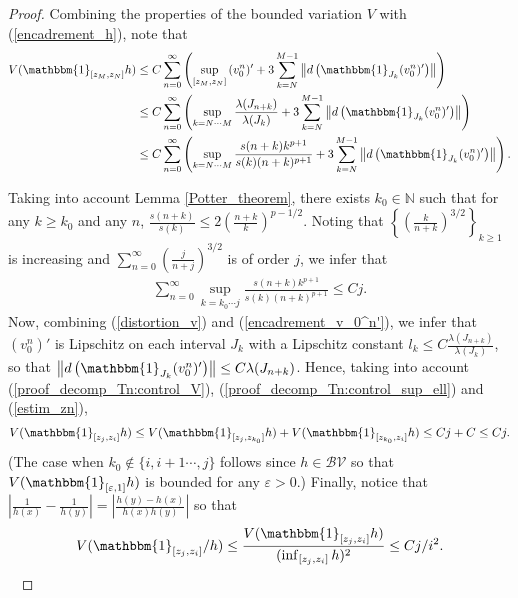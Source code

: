 \documentclass{ws-sd}
\newcommand{\indic}{\mathbbm{1}}
\newcommand{\norm}[1]{\left\Vert #1\right\Vert}
\newcommand{\abs}[1]{\left\lvert #1 \right\rvert}
\newcommand\bigp[1]{\left(#1\right)}
\begin{document}
\begin{proof}
Combining the properties of the bounded variation $V$ with (\ref{encadrement_h}), note that
\begin{align}
        \label{proof_decomp_Tn:control_V}
    V(\indic_{[z_M,z_N]}h)
    &\le
    C\sum_{n = 0}^\infty \bigp{\sup_{[z_M,z_N]}{(v_0^n)'} + 3 \sum_{k = N}^{M-1} \norm{d\bigp{\indic_{J_k}(v_0^n)'}}}
    \nonumber \\
    &\le
    C\sum_{n = 0}^\infty \bigp{\sup_{k = N \cdots M} \frac{\lambda(J_{n+k})}{\lambda(J_{k})} + 3 \sum_{k = N}^{M-1} \norm{d\bigp{\indic_{J_k}(v_0^n)'}}}
    \nonumber \\
    &\le
    C\sum_{n = 0}^\infty \bigp{\sup_{k = N \cdots M} \frac{s(n+k) k^{p+1}}{s(k) (n+k)^{p+1}} + 3 \sum_{k = N}^{M -1} \norm{d\bigp{\indic_{J_k}(v_0^n)'}}}.
\end{align}

Taking into account Lemma \ref{Potter_theorem}, there exists $k_0 \in \mathbb N$ such that for any $k \ge k_0$ and any $n$, $\frac{s(n+k)}{s(k)}\le 2\bigp{\frac{n+k}{k}}^{p-1/2}$. Noting that $\left\{\bigp{\frac{k}{n+k}}^{3/2}\right\}_{k \ge 1}$ is increasing and $\sum_{n = 0}^\infty \bigp{\frac{j}{n+j}}^{3/2}$ is of order $j$, we infer that
\begin{align}
        \label{proof_decomp_Tn:control_sup_ell}
    \sum_{n = 0}^\infty \sup_{k = k_0 \cdots j} \frac{s(n+k) k^{p+1}}{s(k) (n+k)^{p+1}} \le Cj.
\end{align}
Now, combining (\ref{distortion_v}) and (\ref{encadrement_v_0^n'}), we infer that $(v_0^n)'$ is Lipschitz on each interval $J_k$ with a Lipschitz constant $l_k \le C\frac{\lambda(J_{n+k})}{\lambda(J_k)}$, so that $\norm{d\bigp{\indic_{J_k}(v_0^n)'}} \le C \lambda(J_{n+k})$.
Hence, taking into account (\ref{proof_decomp_Tn:control_V}), (\ref{proof_decomp_Tn:control_sup_ell}) and  (\ref{estim_zn}),
\begin{align*}
     V(\indic_{[z_j,z_i]}h)
     \le
     V(\indic_{[z_j,z_{k_0}]}h) + V(\indic_{[z_{k_0}, z_i]}h)
     \le
     Cj + C
     \le
     Cj.
\end{align*}
(The case when $k_0 \notin \{i, i+1 \cdots, j\}$ follows since $h \in \mathcal{BV}$ so that $V(\indic_{[\varepsilon, 1]}h)$ is bounded for any $\varepsilon > 0$.)
Finally, notice that $\abs{\frac{1}{h(x)}-\frac{1}{h(y)}} = \abs{\frac{h(y)-h(x)}{h(x)h(y)}}$ so that
\begin{align*}
    V(\indic_{[z_j,z_i]}/h) \le \frac{V(\indic_{[z_j,z_i]}h)}{(\inf_{[z_j,z_i]}h)^2} \le Cj/i^2.
\end{align*}~
\end{proof}
\end{document}
